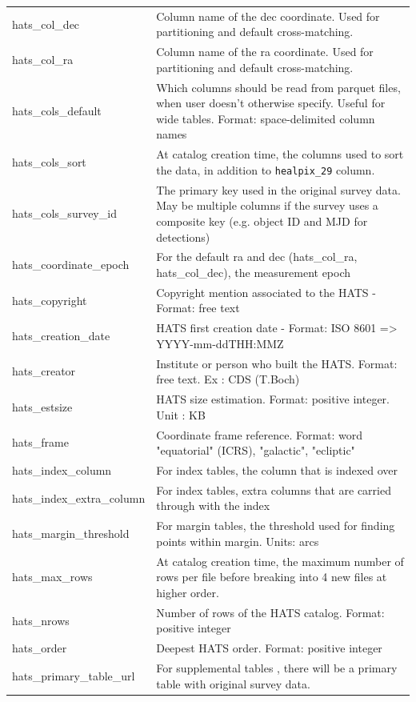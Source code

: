 \documentclass[11pt,a4paper]{ivoa}
\begin{document}
{\begin{longtable}[h!]{D{0.33\textwidth} D{0.67\textwidth}}
hats\_col\_dec &Column name of the dec coordinate. Used for partitioning and default cross-matching. \\
hats\_col\_ra &Column name of the ra coordinate. Used for partitioning and default cross-matching. \\
hats\_cols\_default &Which columns should be read from parquet files, when user doesn't otherwise specify. Useful for wide tables. Format: space-delimited column names \\
hats\_cols\_sort &At catalog creation time, the columns used to sort the data, in addition to \texttt{healpix\_29} column. \\
hats\_cols\_survey\_id &The primary key used in the original survey data. May be multiple columns if the survey uses a composite key (e.g. object ID and MJD for detections) \\
hats\_coordinate\_epoch &For the default ra and dec (hats\_col\_ra, hats\_col\_dec), the measurement epoch \\
hats\_copyright &Copyright mention associated to the HATS - Format: free text \\
hats\_creation\_date &HATS first creation date - Format: ISO 8601 => YYYY-mm-ddTHH:MMZ \\
hats\_creator &Institute or person who built the HATS. Format: free text. Ex : CDS (T.Boch) \\
hats\_estsize &HATS size estimation. Format: positive integer. Unit : KB \\
hats\_frame &Coordinate frame reference. Format: word "equatorial" (ICRS), "galactic", "ecliptic" \\
hats\_index\_column &For index tables, the column that is indexed over \\
hats\_index\_extra\_column &For index tables, extra columns that are carried through with the index \\
hats\_margin\_threshold &For margin tables, the threshold used for finding points within margin. Units: arcs \\
hats\_max\_rows &At catalog creation time, the maximum number of rows per file before breaking into 4 new files at higher order. \\
hats\_nrows &Number of rows of the HATS catalog. Format: positive integer \\
hats\_order &Deepest HATS order. Format: positive integer \\
hats\_primary\_table\_url &For supplemental tables , there will be a primary table with original survey data. \\

\end{longtable}}
\end{document}
